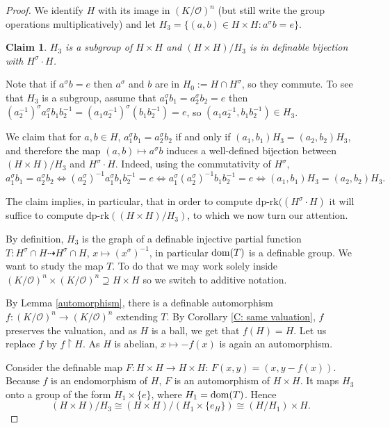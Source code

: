 \documentclass[11pt]{amsart}
\newtheorem{claim}{Claim}[theorem]
\theoremstyle{definition}
\newcommand{\CO}{{\mathcal O}}
\newcommand{\0}{\emptyset}
\def\dpr{\mathrm{dp\text{-}rk}}
\newenvironment{claimproof}[1][\proofname]
  {%
    \proof[#1]%
      \renewcommand*\qedsymbol{$\square$ (claim)}%
  }
  {%
    \endproof%
  }
\begin{document}
\begin{proof} 
We identify $H$ with its image in  $(K/\CO)^n$ (but still write the group operations multiplicatively)  and let  $H_3=\{(a,b)\in H\times H: a^\sigma b=e\}$.

\begin{claim} 
$H_3$ is a subgroup of $H\times H$ and $(H\times H)/H_3$ is in definable bijection with $H^\sigma\cdot H$.
\end{claim}
\begin{claimproof}
Note that if $a^\sigma b=e$ then $a^\sigma $ and $b$ are in $H_0:=H\cap H^\sigma$, so they commute.  To see that $H_3$ is a subgroup, assume that  $a_1^\sigma b_1=a_2^\sigma b_2=e$ then $(a_2^{-1})^\sigma a_1^\sigma b_1b_2^{-1}=(a_1a_2^{-1})^\sigma (b_1b_2^{-1})=e$, so $(a_1a_2^{-1}, b_1b_2^{-1})\in H_3$.



We claim that for $a,b\in H$,
$a_1^\sigma b_1=a_2^\sigma b_2$ if and only if $(a_1,b_1)H_3=(a_2,b_2)H_3$, and therefore the map $(a,b)\mapsto a^\sigma b$ induces a well-defined bijection between $(H\times H)/H_3$ and $H^\sigma \cdot H$. Indeed, using the commutativity of $H^\sigma$,
\[a_1^\sigma b_1=a_2^\sigma b_2\Leftrightarrow (a_2^\sigma)^{-1} a_1^\sigma b_1b_2^{-1}=e\Leftrightarrow a_1^\sigma (a_2^\sigma)^{-1}b_1b_2^{-1}=e\Leftrightarrow (a_1,b_1)H_3=(a_2,b_2)H_3.\]\qedhere \end{claimproof}



The claim implies, in particular, that in order to compute $\dpr( (H^\sigma\cdot H)$ it will suffice to compute $\dpr\left( (H\times H)/H_3\right)$, to which we now turn our attention. 

By definition, $H_3$ is the graph of a definable injective partial function $T:H^\sigma\cap H\dashrightarrow H^\sigma\cap H$, $x\mapsto (x^{\sigma})^{-1}$, in particular $\operatorname{dom}(T)$ is a definable group. We want to study the map $T$. To do that we may  work solely inside $(K/\CO)^n\times (K/\CO)^n \supseteq H\times H$ so we switch to additive notation.


By Lemma \ref{automorphism}, there is a definable automorphism 
$f:(K/\CO)^n\to (K/\CO)^n$ extending $T$.  By Corollary \ref{C: same valuation}, $f$ preserves the valuation, and as $H$ is a ball, we get that $f(H)=H$. Let us replace $f$ by $f\restriction H$. As $H$ is abelian, $x\mapsto -f(x)$ is again an automorphism.

Consider the definable map $F:H\times H\to H\times H$: $F(x,y)=(x,y-f(x))$.
Because $f$ is an endomorphism of $H$, $F$ is an automorphism of $H\times H$. It maps $H_3$ onto a group of the form $H_1\times \{e\}$, where $H_1=\operatorname{dom}(T)$. Hence
\[(H\times H)/H_3 \cong (H\times H)/(H_1\times \{e_H\}) \cong (H/H_1)\times H.\] 


\end{proof}
\end{document}
